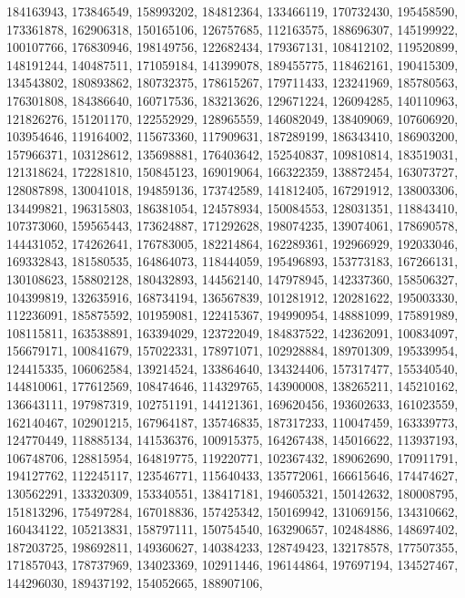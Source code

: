 {{    184163943, 173846549, 158993202, 184812364, 133466119, 170732430,
    195458590, 173361878, 162906318, 150165106, 126757685, 112163575,
    188696307, 145199922, 100107766, 176830946, 198149756, 122682434,
    179367131, 108412102, 119520899, 148191244, 140487511, 171059184,
    141399078, 189455775, 118462161, 190415309, 134543802, 180893862,
    180732375, 178615267, 179711433, 123241969, 185780563, 176301808,
    184386640, 160717536, 183213626, 129671224, 126094285, 140110963,
    121826276, 151201170, 122552929, 128965559, 146082049, 138409069,
    107606920, 103954646, 119164002, 115673360, 117909631, 187289199,
    186343410, 186903200, 157966371, 103128612, 135698881, 176403642,
    152540837, 109810814, 183519031, 121318624, 172281810, 150845123,
    169019064, 166322359, 138872454, 163073727, 128087898, 130041018,
    194859136, 173742589, 141812405, 167291912, 138003306, 134499821,
    196315803, 186381054, 124578934, 150084553, 128031351, 118843410,
    107373060, 159565443, 173624887, 171292628, 198074235, 139074061,
    178690578, 144431052, 174262641, 176783005, 182214864, 162289361,
    192966929, 192033046, 169332843, 181580535, 164864073, 118444059,
    195496893, 153773183, 167266131, 130108623, 158802128, 180432893,
    144562140, 147978945, 142337360, 158506327, 104399819, 132635916,
    168734194, 136567839, 101281912, 120281622, 195003330, 112236091,
    185875592, 101959081, 122415367, 194990954, 148881099, 175891989,
    108115811, 163538891, 163394029, 123722049, 184837522, 142362091,
    100834097, 156679171, 100841679, 157022331, 178971071, 102928884,
    189701309, 195339954, 124415335, 106062584, 139214524, 133864640,
    134324406, 157317477, 155340540, 144810061, 177612569, 108474646,
    114329765, 143900008, 138265211, 145210162, 136643111, 197987319,
    102751191, 144121361, 169620456, 193602633, 161023559, 162140467,
    102901215, 167964187, 135746835, 187317233, 110047459, 163339773,
    124770449, 118885134, 141536376, 100915375, 164267438, 145016622,
    113937193, 106748706, 128815954, 164819775, 119220771, 102367432,
    189062690, 170911791, 194127762, 112245117, 123546771, 115640433,
    135772061, 166615646, 174474627, 130562291, 133320309, 153340551,
    138417181, 194605321, 150142632, 180008795, 151813296, 175497284,
    167018836, 157425342, 150169942, 131069156, 134310662, 160434122,
    105213831, 158797111, 150754540, 163290657, 102484886, 148697402,
    187203725, 198692811, 149360627, 140384233, 128749423, 132178578,
    177507355, 171857043, 178737969, 134023369, 102911446, 196144864,
    197697194, 134527467, 144296030, 189437192, 154052665, 188907106,
}}

